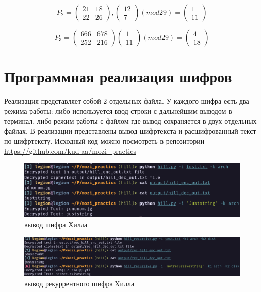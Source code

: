 \documentclass[a4paper]{article}
\begin{document}
\[
    P_2=
    \begin{pmatrix}
        21 & 18 \\
        22 & 26
    \end{pmatrix},
    \begin{pmatrix}
        12 \\
        7
    \end{pmatrix}
    (mod 29) =
    \begin{pmatrix}
        1 \\
        11
    \end{pmatrix}
\]

\[
    P_3=
    \begin{pmatrix}
        666 & 678 \\
        252 & 216
    \end{pmatrix}
    \begin{pmatrix}
        1 \\
        11
    \end{pmatrix}
    (mod 29) =
    \begin{pmatrix}
        4 \\
        18
    \end{pmatrix}
\]

\section{Программная реализация шифров}
Реализация представляет собой 2 отдельных файла. У каждого шифра есть два
режима работы: либо используется ввод строки с дальнейшим выводом в терминал, либо режим работы с файлом где вывод сохраняется в двух отдельных файлах. В реализации представлены вывод шифртекста и расшифрованный текст по шифртексту. Исходный код можно посмотреть в репозитории \url{https://github.com/kud-aa/mozi_practics}

\begin{figure}[h]
    \centering
    \includegraphics[width=\textwidth]{hill_1.png}
    \caption{вывод шифра Хилла}
\end{figure}

\begin{figure}[h]
    \centering
    \includegraphics[width=\textwidth]{hill_2.png}
    \caption{вывод рекуррентного шифра Хилла}
\end{figure}
\end{document}
